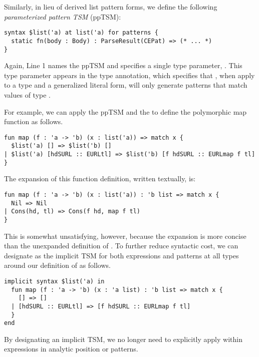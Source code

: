Similarly, in lieu of derived list pattern forms, we define the following \emph{parameterized pattern TSM} (ppTSM):
\begin{lstlisting}[numbers=none]
syntax $list('a) at list('a) for patterns {
  static fn(body : Body) : ParseResult(CEPat) => (* ... *)
}
\end{lstlisting}
Again, Line 1 names the ppTSM  and specifies a single type parameter, . This type parameter appears in the type annotation, which specifies that , when apply to a type  and a generalized literal form, will only generate patterns that match values of type . 

For example, we can apply the ppTSM  and the  to define the polymorphic map function as follows.
\begin{lstlisting}[numbers=none]
fun map (f : 'a -> 'b) (x : list('a)) => match x { 
  $list('a) [] => $list('b) []
| $list('a) [hdSURL :: EURLtl] => $list('b) [f hdSURL :: EURLmap f tl]
}
\end{lstlisting}
The expansion of this function definition, written textually, is:
\begin{lstlisting}[numbers=none]
fun map (f : 'a -> 'b) (x : list('a)) : 'b list => match x { 
  Nil => Nil
| Cons(hd, tl) => Cons(f hd, map f tl)
}
\end{lstlisting}
This is somewhat unsatisfying, however, because the expansion is more concise than the unexpanded definition of . To further reduce syntactic cost, we can designate  as the implicit TSM for both expressions and patterns at all types  around our definition of  as follows.
\begin{lstlisting}[numbers=none]
implicit syntax $list('a) in
  fun map (f : 'a -> 'b) (x : 'a list) : 'b list => match x {
    [] => []
  | [hdSURL :: EURLtl] => [f hdSURL :: EURLmap f tl]
  }
end
\end{lstlisting}
By designating an implicit TSM, we no longer need to explicitly apply  within expressions in analytic position or patterns.

